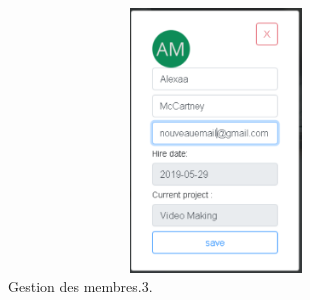 \begin{figure}[H]
\center
\includegraphics[width=11cm,height=7cm]{./figures/pres/mm3.png}
\caption{Gestion des membres.3.}
\end{figure}


